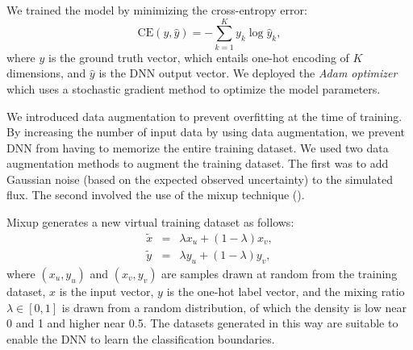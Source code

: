 \documentclass[useamsfonts]{pasj01}
\begin{document}
We trained the model by minimizing the cross-entropy error: 
\begin{equation}
\mathrm{CE} \left(y, \hat{y} \right) =　-\sum_{k = 1}^K y_k \log \hat{y}_k,
\end{equation}
where $y$ is the ground truth vector, which entails one-hot encoding of $K$ dimensions, and $\hat{y}$ is the DNN output vector.
We deployed the {\it Adam optimizer} \citep{Kingma2014} which uses a stochastic gradient method to optimize the model parameters.

We introduced data augmentation to prevent overfitting at the time of training.
By increasing the number of input data by using data augmentation, we prevent DNN from having to memorize the entire training dataset.
We used two data augmentation methods to augment the training dataset.
The first was to add Gaussian noise (based on the expected observed uncertainty) to the simulated flux.
The second involved the use of the mixup technique (\cite{mixup}).

Mixup generates a new virtual training dataset as follows:
\begin{eqnarray*}
    \tilde{x} &=& \lambda x_u + \left( 1-\lambda \right) x_v, \\
    \tilde{y} &=& \lambda y_u + \left( 1-\lambda \right) y_v,
\end{eqnarray*}
where $\left(x_u, y_u\right)$ and $\left(x_v, y_v\right)$ are samples drawn at random from the training dataset, $x$ is the input vector, $y$ is the one-hot label vector, and the mixing ratio $\lambda \in \left[0, 1\right]$ is drawn from a random distribution, of which the density is low near 0 and 1 and higher near 0.5. 
The datasets generated in this way are suitable to enable the DNN to learn the classification boundaries.
\end{document}
